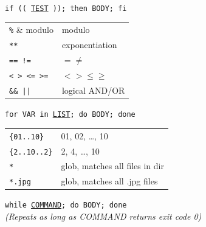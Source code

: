 \documentclass[a4paper, twocolumn]{article}
\renewcommand{\tt}{\texttt}
\begin{document}
\tt{if (( \underline{TEST} )); then BODY; fi}
\vspace{0.3cm}

\begin{tabular}{ll}
    \verb|%|            & modulo                                    \\
    \verb|**|           & exponentiation                            \\
    \verb|== !=|        & $= \neq$                                  \\
    \verb|< > <= >=|    & $< > \leq \geq$                           \\
    \verb!&& ||!        & logical AND/OR
\end{tabular}
\vspace{0.5cm}

\tt{for VAR in \underline{LIST}; do BODY; done}
\vspace{0.3cm}

\begin{tabular}{ll}
    \verb|{01..10}|     & 01, 02, \dots, 10                         \\
    \verb|{2..10..2}|   & 2, 4, \dots, 10                           \\
    \verb|*|            & glob, matches all files in dir            \\
    \verb|*.jpg|        & glob, matches all .jpg files              
\end{tabular}
\vspace{0.5cm}

\tt{while \underline{COMMAND}; do BODY; done}
\vspace{0.1cm}\\
{\footnotesize \textit{(Repeats as long as COMMAND returns exit code 0)}}
\vspace{0.3cm}
\end{document}
